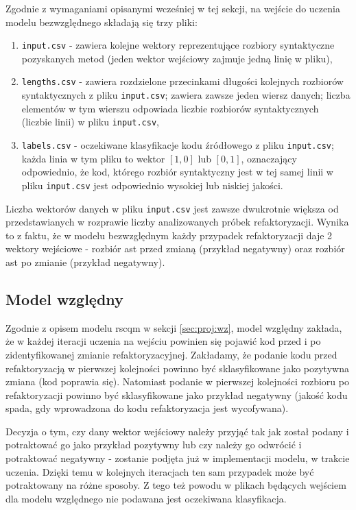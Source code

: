 \documentclass[12pt]{report}
\begin{document}
Zgodnie z wymaganiami opisanymi wcześniej w tej sekcji, na wejście do uczenia modelu bezwzględnego składają się trzy pliki:

\begin{enumerate}
\item \texttt{input.csv} - zawiera kolejne wektory reprezentujące rozbiory syntaktyczne pozyskanych metod (jeden wektor wejściowy zajmuje jedną linię w pliku),
\item \texttt{lengths.csv} - zawiera rozdzielone przecinkami długości kolejnych rozbiorów syntaktycznych z pliku \texttt{input.csv}; zawiera zawsze jeden wiersz danych; liczba elementów w tym wierszu odpowiada liczbie rozbiorów syntaktycznych (liczbie linii) w pliku \texttt{input.csv},
\item \texttt{labels.csv} - oczekiwane klasyfikacje kodu źródłowego z pliku \texttt{input.csv}; każda linia w tym pliku to wektor $[1,0]$ lub $[0,1]$, oznaczający odpowiednio, że kod, którego rozbiór syntaktyczny jest w tej samej linii w pliku \texttt{input.csv} jest odpowiednio wysokiej lub niskiej jakości.
\end{enumerate}

Liczba wektorów danych w pliku \texttt{input.csv} jest zawsze dwukrotnie większa od przedstawianych w rozprawie liczby analizowanych próbek refaktoryzacji. Wynika to z faktu, że w modelu bezwzględnym każdy przypadek refaktoryzacji daje 2 wektory wejściowe - rozbiór \gls{ast} przed zmianą (przykład negatywny) oraz rozbiór \gls{ast} po zmianie (przykład negatywny).

\subsection{Model względny}

Zgodnie z opisem modelu \gls{rscqm} w sekcji \ref{sec:proj:wz}, model względny zakłada, że w każdej iteracji uczenia na wejściu powinien się pojawić kod przed i po zidentyfikowanej zmianie refaktoryzacyjnej. Zakładamy, że podanie kodu przed refaktoryzacją w pierwszej kolejności powinno być sklasyfikowane jako pozytywna zmiana (kod poprawia się). Natomiast podanie w pierwszej kolejności rozbioru po refaktoryzacji powinno być sklasyfikowane jako przykład negatywny (jakość kodu spada, gdy wprowadzona do kodu refaktoryzacja jest wycofywana).

Decyzja o tym, czy dany wektor wejściowy należy przyjąć tak jak został podany i potraktować go jako przykład pozytywny lub czy należy go odwrócić i potraktować negatywny - zostanie podjęta już w implementacji modelu, w trakcie uczenia. Dzięki temu w kolejnych iteracjach ten sam przypadek może być potraktowany na różne sposoby. Z tego też powodu w plikach będących wejściem dla modelu względnego nie podawana jest oczekiwana klasyfikacja.
\end{document}
